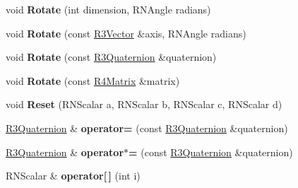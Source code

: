 \begin{DoxyCompactItemize}
\item 
void {\bfseries Rotate} (int dimension, R\+N\+Angle radians)\hypertarget{class_r3_quaternion_af8153bf646d0e4950df239cd1cf27917}{}\label{class_r3_quaternion_af8153bf646d0e4950df239cd1cf27917}

\item 
void {\bfseries Rotate} (const \hyperlink{class_r3_vector}{R3\+Vector} \&axis, R\+N\+Angle radians)\hypertarget{class_r3_quaternion_a178f76d7700511bac879a35a028a7e88}{}\label{class_r3_quaternion_a178f76d7700511bac879a35a028a7e88}

\item 
void {\bfseries Rotate} (const \hyperlink{class_r3_quaternion}{R3\+Quaternion} \&quaternion)\hypertarget{class_r3_quaternion_a344fe7ac55ddd139af556ac18f701b04}{}\label{class_r3_quaternion_a344fe7ac55ddd139af556ac18f701b04}

\item 
void {\bfseries Rotate} (const \hyperlink{class_r4_matrix}{R4\+Matrix} \&matrix)\hypertarget{class_r3_quaternion_ab5c795c99c9752e79c8ba4a9f781f139}{}\label{class_r3_quaternion_ab5c795c99c9752e79c8ba4a9f781f139}

\item 
void {\bfseries Reset} (R\+N\+Scalar a, R\+N\+Scalar b, R\+N\+Scalar c, R\+N\+Scalar d)\hypertarget{class_r3_quaternion_a0b5183e34b3b46403cac6d8d11c12cb2}{}\label{class_r3_quaternion_a0b5183e34b3b46403cac6d8d11c12cb2}

\item 
\hyperlink{class_r3_quaternion}{R3\+Quaternion} \& {\bfseries operator=} (const \hyperlink{class_r3_quaternion}{R3\+Quaternion} \&quaternion)\hypertarget{class_r3_quaternion_a900fb2413318c32aa0300834d9552ef7}{}\label{class_r3_quaternion_a900fb2413318c32aa0300834d9552ef7}

\item 
\hyperlink{class_r3_quaternion}{R3\+Quaternion} \& {\bfseries operator$\ast$=} (const \hyperlink{class_r3_quaternion}{R3\+Quaternion} \&quaternion)\hypertarget{class_r3_quaternion_a898bea3961701a4f48ccc4dc2827d07c}{}\label{class_r3_quaternion_a898bea3961701a4f48ccc4dc2827d07c}

\item 
R\+N\+Scalar \& {\bfseries operator\mbox{[}$\,$\mbox{]}} (int i)\hypertarget{class_r3_quaternion_a9e2b6d678d28a64a4ab9a64e61fc125d}{}\label{class_r3_quaternion_a9e2b6d678d28a64a4ab9a64e61fc125d}

\end{DoxyCompactItemize}
